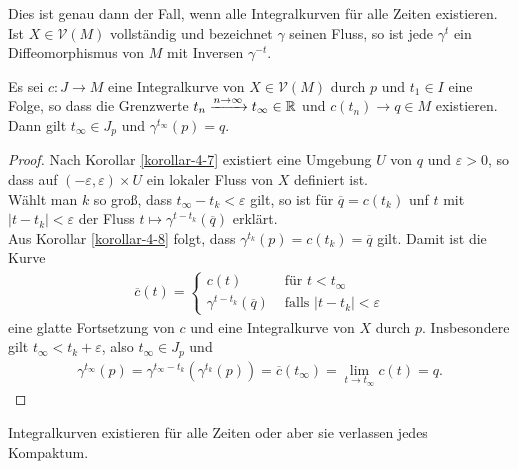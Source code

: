 \begin{bem*}
  Dies ist genau dann der Fall, wenn alle Integralkurven für alle Zeiten existieren.\\
  Ist $X \in \mathcal V(M)$ vollständig und bezeichnet $\gamma$ seinen Fluss, so ist jede $\gamma^t$ ein Diffeomorphismus von $M$ mit Inversen $\gamma^{-t}$.
\end{bem*}

\begin{lemma}
  Es sei $c \colon J \to M$ eine Integralkurve von $X \in \mathcal V(M)$ durch $p$ und $t_1 \in I$ eine Folge, so dass die Grenzwerte $t_n \xrightarrow{n\to\infty} t_{\infty} \in \operatorname{\mathbb{R}}$ und $c(t_n) \to q \in M$ existieren.\\
  Dann gilt $t_{\infty} \in J_{p}$ und $\gamma^{t_{\infty}}(p) = q$.
\end{lemma}

\begin{proof}
  Nach Korollar \ref{korollar-4-7} existiert eine Umgebung $U$ von $q$ und $\varepsilon > 0$, so dass auf $(-\varepsilon,\varepsilon) \times U$ ein lokaler Fluss von $X$ definiert ist.\\
  Wählt man $k$ so groß, dass $t_{\infty} - t_k < \varepsilon$ gilt, so ist für $\overline q = c(t_k)$ unf $t$ mit $|t-t_k| < \varepsilon$ der Fluss $t \mapsto \gamma^{t-t_k}(\overline q)$ erklärt.\\
  Aus Korollar \ref{korollar-4-8} folgt, dass $\gamma^{t_k}(p) = c(t_k) = \overline q$ gilt.
  Damit ist die Kurve
  \begin{align*}
    \overline c(t) =
    \begin{cases}
      c(t) & \text{ für } t < t_{\infty}\\
      \gamma^{t-t_k}(\overline q) & \text{ falls } |t-t_k| < \varepsilon
    \end{cases}
  \end{align*}
  eine glatte Fortsetzung von $c$ und eine Integralkurve von $X$ durch $p$.
  Insbesondere gilt $t_{\infty} < t_k + \varepsilon$, also $t_{\infty} \in J_p$ und
  \begin{align*}
    \gamma^{t_{\infty}}(p)= \gamma^{t_{\infty}-t_k}(\gamma^{t_k}(p)) = \overline c(t_{\infty}) = \lim_{t\to t_{\infty}}c(t) = q.
  \end{align*}
\end{proof}

\begin{bem}
  Integralkurven existieren für alle Zeiten oder aber sie verlassen jedes Kompaktum.
\end{bem}

